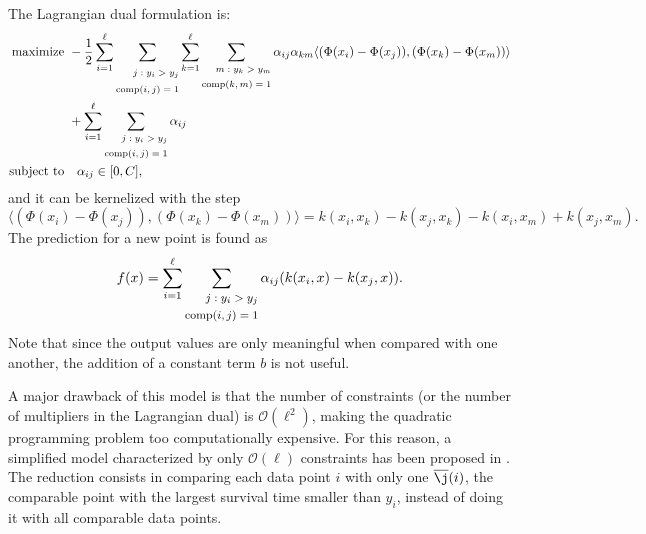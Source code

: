 \documentclass[12pt]{report}
\begin{document}
The Lagrangian dual formulation is:
\begin{equation} \label{ranksvmcdual}
\begin{split}
\text{maximize} &\
-\dfrac{1}{2}\sum_{i=1}^{\ell}\sum_{\scriptsize\begin{split} j:y_{i} > y_{j} \\ \text{comp}(i,j) = 1 \end{split}}\sum_{k=1}^{\ell}\sum_{\scriptsize\begin{split} m:y_{k} > y_{m} \\ \text{comp}(k,m) = 1 \end{split}}\alpha_{ij}\alpha_{km}\langle (\Phi(x_{i}) - \Phi(x_{j})),(\Phi(x_{k}) - \Phi(x_{m}))\rangle \\ &\ + \sum_{i=1}^{\ell}\sum_{\scriptsize\begin{split} j:y_{i} > y_{j} \\ \text{comp}(i,j) = 1 \end{split}}\alpha_{ij} \\
\text{subject to} &\quad \alpha_{ij} \in [0,C] \text{,}
\end{split}
\end{equation}
and it can be kernelized with the step
\begin{equation} \label{ranksvmckern}
\langle (\Phi(x_{i}) - \Phi(x_{j})),(\Phi(x_{k}) - \Phi(x_{m}))\rangle = k(x_{i},x_{k})-k(x_{j},x_{k})-k(x_{i},x_{m})+k(x_{j},x_{m}) \text{.}
\end{equation}
The prediction for a new point is found as
\begin{equation} \label{ranksvmcf}
f(x) = \sum_{i=1}^{\ell}\sum_{\footnotesize\begin{split} j:y_{i} > y_{j} \\ \text{comp}(i,j) = 1 \end{split}}\alpha_{ij}(k(x_{i},x) - k(x_{j},x)) \text{.}
\end{equation}
Note that since the output values are only meaningful when compared with one another, the addition of a constant term $b$ is not useful.

A major drawback of this model is that the number of constraints (or the number of multipliers in the Lagrangian dual) is $\mathcal{O}(\ell^{2})$, making the quadratic programming problem too computationally expensive. For this reason, a simplified model characterized by only $\mathcal{O}(\ell)$ constraints has been proposed in \cite{vanbelle08}. The reduction consists in comparing each data point $i$ with only one $\overline{\j}(i)$, the comparable point with the largest survival time smaller than $y_{i}$, instead of doing it with all comparable data points.
\end{document}
